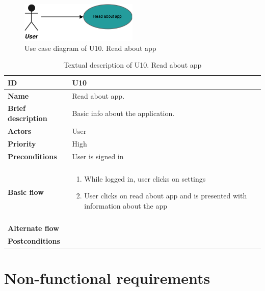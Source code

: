 \begin{figure}[hp]
	\includegraphics[width=0.5\textwidth]{fig/U10}
	\centering
	\caption{Use case diagram of U10. Read about app}
	\label{Fig:U10}
\end{figure}

\begin{table}[hp]
	\renewcommand{\arraystretch}{1.5}
	\centering
	\caption{Textual description of U10. Read about app}
	\begin{tabular}[b]{|l | l|}\hline
		\textbf{ID} 				& U10									\\\hline
		\textbf{Name} 				& Read about app.						\\\hline
		\textbf{Brief description}	& Basic info about the application. 	\\\hline
		\textbf{Actors} 			& User									\\\hline
		\textbf{Priority}			& High									\\\hline
		\textbf{Preconditions}		& User is signed in						\\\hline&\\[-2ex]
		\textbf{Basic flow}			& \begin{minipage}{5in}
			\begin{enumerate}[noitemsep]
				\item While logged in, user clicks on settings
				\item User clicks on read about app and is presented with information about the app
			\end{enumerate}						
		\end{minipage}						\\\hline&\\[-2ex]
		\textbf{Alternate flow}		& \begin{minipage}{5in}
		\end{minipage}							\\\hline
		\textbf{Postconditions}		& \\\hline
	\end{tabular}
	\label{Tab:U10}
\end{table}

\pagebreak
\section{Non-functional requirements}
\label{sec:non-functional_requirements}

